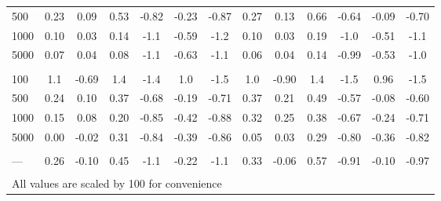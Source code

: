 \documentclass[AMA,STIX1COL,doublespace]{WileyNJD-v2}
\begin{document}
\begin{table}
\begin{tabular}[t]{lcccccccccccc}
\hspace{1em}500 & 0.23 & 0.09 & 0.53 & -0.82 & -0.23 & -0.87 & 0.27 & 0.13 & 0.66 & -0.64 & -0.09 & -0.70\\
\hspace{1em}1000 & 0.10 & 0.03 & 0.14 & -1.1 & -0.59 & -1.2 & 0.10 & 0.03 & 0.19 & -1.0 & -0.51 & -1.1\\
\hspace{1em}5000 & 0.07 & 0.04 & 0.08 & -1.1 & -0.63 & -1.1 & 0.06 & 0.04 & 0.14 & -0.99 & -0.53 & -1.0\\
\addlinespace[0.75em]
\multicolumn{13}{l}{\textbf{10 predictors, 490 junk}}\\
\hline
\hspace{1em}100 & 1.1 & -0.69 & 1.4 & -1.4 & 1.0 & -1.5 & 1.0 & -0.90 & 1.4 & -1.5 & 0.96 & -1.5\\
\hspace{1em}500 & 0.24 & 0.10 & 0.37 & -0.68 & -0.19 & -0.71 & 0.37 & 0.21 & 0.49 & -0.57 & -0.08 & -0.60\\
\hspace{1em}1000 & 0.15 & 0.08 & 0.20 & -0.85 & -0.42 & -0.88 & 0.32 & 0.25 & 0.38 & -0.67 & -0.24 & -0.71\\
\hspace{1em}5000 & 0.00 & -0.02 & 0.31 & -0.84 & -0.39 & -0.86 & 0.05 & 0.03 & 0.29 & -0.80 & -0.36 & -0.82\\
\addlinespace[0.75em]
\multicolumn{13}{l}{\textbf{Overall}}\\
\hline
\hspace{1em}--- & 0.26 & -0.10 & 0.45 & -1.1 & -0.22 & -1.1 & 0.33 & -0.06 & 0.57 & -0.91 & -0.10 & -0.97\\
\bottomrule
\multicolumn{13}{l}{\textsuperscript{} All values are scaled by 100 for convenience}\\
\end{tabular}
\end{table}
\end{document}
